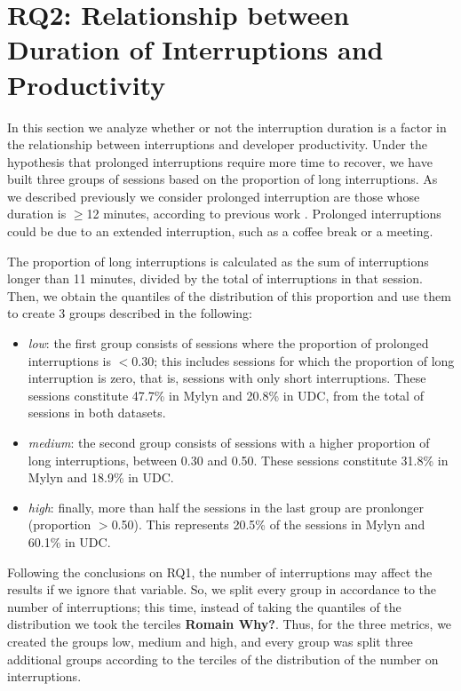 \documentclass[times]{smrauth}
\newcommand\RR[1]{\textbf{Romain #1}}
\begin{document}
\section{RQ2: Relationship between Duration of Interruptions and Productivity}

In this section we analyze whether or not the interruption duration is a factor in the relationship between interruptions and developer productivity. Under the hypothesis that prolonged interruptions require more time to recover, we have built three groups of sessions based on the proportion of long interruptions. As we described previously we consider prolonged interruption are those whose duration is $\geq$12 minutes, according to previous work \cite{GM04, KaptelininN07}. Prolonged interruptions could be due to an extended interruption, such as a coffee break or a meeting.

The proportion of long interruptions is calculated as the sum of interruptions longer than 11 minutes, divided by the total of interruptions in that session. Then, we obtain the quantiles of the distribution of this proportion and use them to create 3 groups described in the following:

\begin{itemize}
\item \textit{low}: the first group consists of sessions where the proportion of prolonged interruptions is $<$0.30; this includes sessions for which the proportion of long interruption is zero, that is, sessions with only short interruptions. These sessions constitute 47.7\% in Mylyn and 20.8\% in UDC, from the total of sessions in both datasets.
\item \textit{medium}: the second group consists of sessions with a higher proportion of long interruptions, between 0.30 and 0.50. These sessions constitute 31.8\% in Mylyn and 18.9\% in UDC.
\item \textit{high}: finally, more than half the sessions in the last group are pronlonger (proportion $>$0.50). This represents 20.5\% of the sessions in Mylyn and 60.1\% in UDC.
\end{itemize} 

Following the conclusions on RQ1, the number of interruptions may affect the results if we ignore that variable. So, we split every group in accordance to the number of interruptions; this time, instead of taking the quantiles of the distribution we took the terciles \RR{Why?}. Thus, for the three metrics, we created the groups low, medium and high, and every group was split three additional groups according to the terciles of the distribution of the number on interruptions. 
\end{document}
